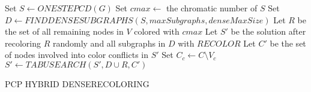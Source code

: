 
\begin{algorithm}
Set $S \gets ONESTEPCD(G)$\;
Set $cmax \gets$ the chromatic number of $S$\;
Set $D \gets FINDDENSESUBGRAPHS( S, maxSubgraphs, denseMaxSize) $\;
Let $R$ be the set of all remaining nodes in $V$ colored with $cmax$\;
Let $S'$ be the solution after recoloring $R$ randomly and all subgraphs in $D$ with $RECOLOR$\;
Let $C'$ be the set of nodes involved into color conflicts in $S'$\;
Set $C_c \gets C \setminus V_c$\;
$S' \gets TABUSEARCH(S', D \cup R, C')$\;

  
\;
\caption{PCP HYBRID DENSERECOLORING}
\label{algo:proposal}
\end{algorithm}
